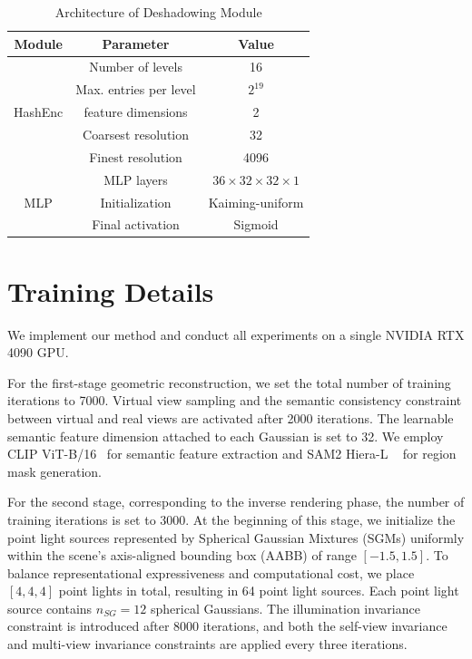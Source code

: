 \begin{table}[h]
\centering
\caption{Architecture of Deshadowing Module}
\label{table:deshadowing}
\vspace{-0.2cm}
\begin{tabular}{ccc}
\hline
\textbf{Module} & \textbf{Parameter} & \textbf{Value} \\
\hline
\multirow{5}{*}{HashEnc} & Number of levels & 16 \\
 & Max. entries per level  & $2^{19}$ \\
 & feature dimensions & 2 \\
 & Coarsest resolution & 32 \\
 & Finest resolution & 4096 \\
\hline
\multirow{3}{*}{MLP} & MLP layers & $36 \times 32 \times 32 \times 1$ \\
 & Initialization & Kaiming-uniform \\
 & Final activation & Sigmoid \\
\hline
\end{tabular}
\end{table}

\section{Training Details}

We implement our method and conduct all experiments on a single NVIDIA RTX 4090 GPU.  

For the first-stage geometric reconstruction, we set the total number of training iterations to 7000.  
Virtual view sampling and the semantic consistency constraint between virtual and real views are activated after 2000 iterations.  
The learnable semantic feature dimension attached to each Gaussian is set to 32.  
We employ CLIP ViT-B/16~\cite{radford2021learning} for semantic feature extraction and SAM2 Hiera-L ~\cite{ravi2024sam} for region mask generation.

For the second stage, corresponding to the inverse rendering phase, the number of training iterations is set to 3000.  
At the beginning of this stage, we initialize the point light sources represented by Spherical Gaussian Mixtures (SGMs) uniformly within the scene’s axis-aligned bounding box (AABB) of range $[-1.5, 1.5]$.  
To balance representational expressiveness and computational cost, we place $[4,4,4]$ point lights in total, resulting in 64 point light sources.  
Each point light source contains $n_{SG}=12$ spherical Gaussians.  
The illumination invariance constraint is introduced after 8000 iterations, and both the self-view invariance and multi-view invariance constraints are applied every three iterations.




